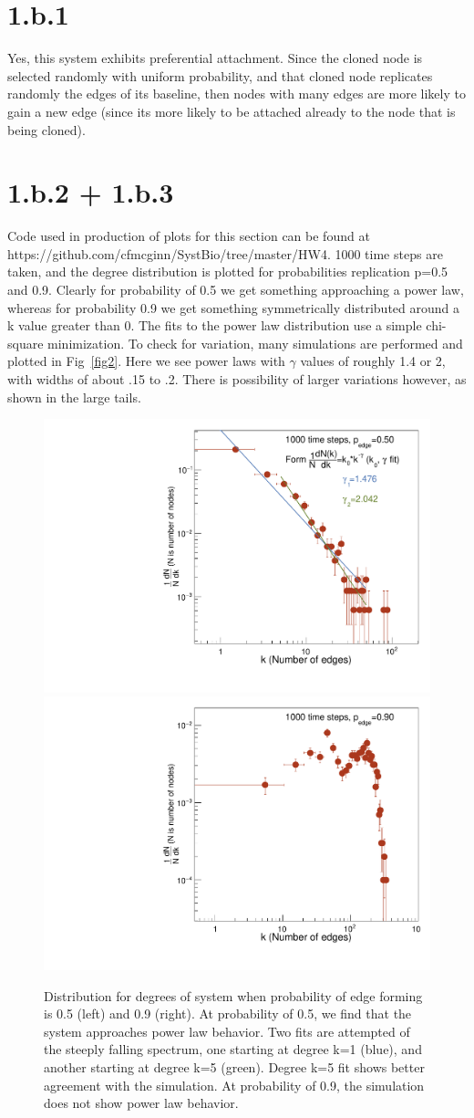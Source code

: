 \documentclass{article}
\begin{document}
\section{1.b.1}

Yes, this system exhibits preferential attachment. Since the cloned node is selected randomly with uniform probability, and that cloned node replicates randomly the edges of its baseline, then nodes with many edges are more likely to gain a new edge (since its more likely to be attached already to the node that is being cloned).

\section{1.b.2 + 1.b.3}

Code used in production of plots for this section can be found at https://github.com/cfmcginn/SystBio/tree/master/HW4. 1000 time steps are taken, and the degree distribution is plotted for probabilities replication p=0.5 and 0.9. Clearly for probability of 0.5 we get something approaching a power law, whereas for probability 0.9 we get something symmetrically distributed around a k value greater than 0. The fits to the power law distribution use a simple chi-square minimization. To check for variation, many simulations are performed and plotted in Fig~\ref{fig2}. Here we see power laws with $\gamma$ values of roughly 1.4 or 2, with widths of about .15 to .2. There is possibility of larger variations however, as shown in the large tails.

\begin{figure}[H]
    \centering
    \includegraphics[width=.49\textwidth]{degreeHist_Prob0p500_20171006_112915.pdf} 
    \includegraphics[width=.49\textwidth]{degreeHist_Prob0p900_20171006_112915.pdf} 
    \caption{Distribution for degrees of system when probability of edge forming is 0.5 (left) and 0.9 (right). At probability of 0.5, we find that the system approaches power law behavior. Two fits are attempted of the steeply falling spectrum, one starting at degree k=1 (blue), and another starting at degree k=5 (green). Degree k=5 fit shows better agreement with the simulation. At probability of 0.9, the simulation does not show power law behavior.}
    \label{fig1}
\end{figure}
\end{document}
